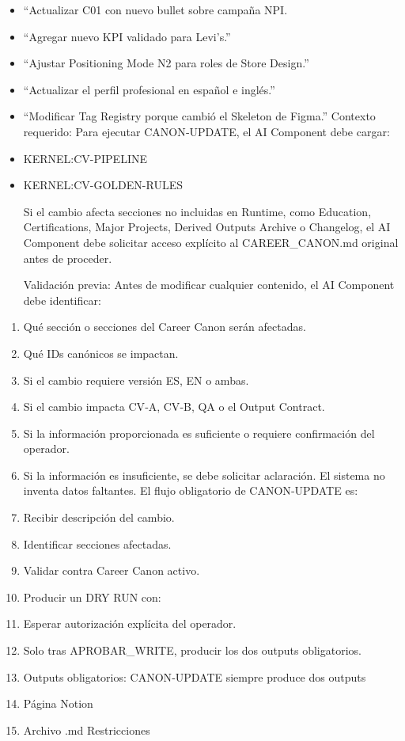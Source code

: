 \documentclass[
]{article}
\providecommand{\tightlist}{%
  \setlength{\itemsep}{0pt}\setlength{\parskip}{0pt}}
\begin{document}
\begin{itemize}
\tightlist
\item
  ``Actualizar C01 con nuevo bullet sobre campaña NPI.
\item
  ``Agregar nuevo KPI validado para Levi's.''
\item
  ``Ajustar Positioning Mode N2 para roles de Store Design.''
\item
  ``Actualizar el perfil profesional en español e inglés.''
\item
  ``Modificar Tag Registry porque cambió el Skeleton de Figma.''
  Contexto requerido: Para ejecutar CANON‑UPDATE, el AI Component debe
  cargar:
\item
  KERNEL:CV-PIPELINE
\item
  KERNEL:CV-GOLDEN-RULES

  Si el cambio afecta secciones no incluidas en Runtime, como Education,
  Certifications, Major Projects, Derived Outputs Archive o Changelog,
  el AI Component debe solicitar acceso explícito al CAREER\_CANON.md
  original antes de proceder.

  Validación previa: Antes de modificar cualquier contenido, el AI
  Component debe identificar:
\end{itemize}

\begin{enumerate}
\def\labelenumi{\arabic{enumi}.}
\tightlist
\item
  Qué sección o secciones del Career Canon serán afectadas.
\item
  Qué IDs canónicos se impactan.
\item
  Si el cambio requiere versión ES, EN o ambas.
\item
  Si el cambio impacta CV‑A, CV‑B, QA o el Output Contract.
\item
  Si la información proporcionada es suficiente o requiere confirmación
  del operador.
\item
  Si la información es insuficiente, se debe solicitar aclaración. El
  sistema no inventa datos faltantes. El flujo obligatorio de
  CANON‑UPDATE es:
\item
  Recibir descripción del cambio.
\item
  Identificar secciones afectadas.
\item
  Validar contra Career Canon activo.
\item
  Producir un DRY RUN con:
\item
  Esperar autorización explícita del operador.
\item
  Solo tras APROBAR\_WRITE, producir los dos outputs obligatorios.
\item
  Outputs obligatorios: CANON‑UPDATE siempre produce dos outputs
\item
  Página Notion
\item
  Archivo .md Restricciones
\end{enumerate}
\end{document}
